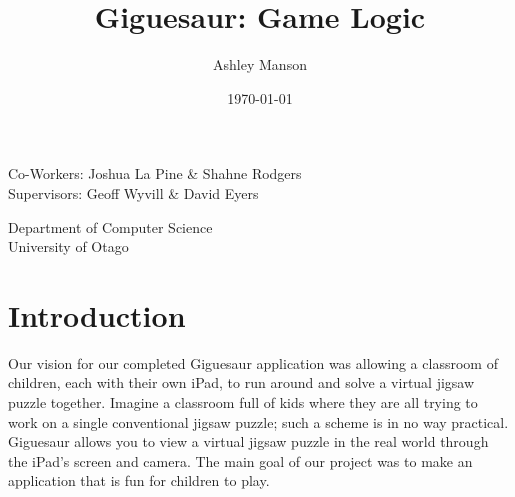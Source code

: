 \documentclass{article}
\begin{document}
\title{Giguesaur: Game Logic}
\author{Ashley Manson}
\date{\today}

\begin{titlepage}
\clearpage
\maketitle
\thispagestyle{empty} %

\begin{center}
\large 
Co-Workers: Joshua La Pine \& Shahne Rodgers\\
Supervisors: Geoff Wyvill \& David Eyers\\

\vspace*{1\baselineskip} %

Department of Computer Science\\
University of Otago

\end{center}

\end{titlepage}


\clearpage
\tableofcontents
\clearpage


\section{Introduction}

Our vision for our completed Giguesaur application was allowing a classroom of
children, each with their own iPad, to run around and solve a virtual jigsaw
puzzle together. Imagine a classroom full of kids where they are all trying to
work on a single conventional jigsaw puzzle; such a scheme is in no way
practical. Giguesaur allows you to view a virtual jigsaw puzzle in the real
world through the iPad's screen and camera. The main goal of our project was to
make an application that is fun for children to play.

\end{document}

